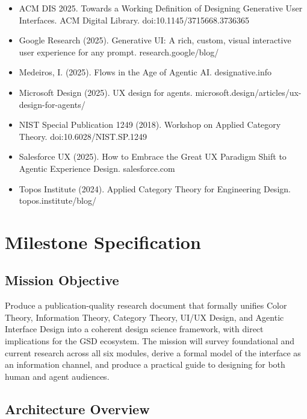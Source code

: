 \documentclass[11pt,letterpaper]{article}
\newcommand{\stageheader}[2]{%
  \noindent\colorbox{#2}{\makebox[\textwidth][l]{%
    \textcolor{white}{\bfseries\sffamily\hspace{6pt}#1\hspace{6pt}}}}%
  \vspace{0.5em}\par%
}
\begin{document}
\begin{itemize}[leftmargin=2em, itemsep=0.2em, label={--}]
  \item ACM DIS 2025. Towards a Working Definition of Designing Generative User Interfaces. ACM Digital Library. doi:10.1145/3715668.3736365
  \item Google Research (2025). Generative UI: A rich, custom, visual interactive user experience for any prompt. research.google/blog/
  \item Medeiros, I. (2025). Flows in the Age of Agentic AI. designative.info
  \item Microsoft Design (2025). UX design for agents. microsoft.design/articles/ux-design-for-agents/
  \item NIST Special Publication 1249 (2018). Workshop on Applied Category Theory. doi:10.6028/NIST.SP.1249
  \item Salesforce UX (2025). How to Embrace the Great UX Paradigm Shift to Agentic Experience Design. salesforce.com
  \item Topos Institute (2024). Applied Category Theory for Engineering Design. topos.institute/blog/
\end{itemize}

\newpage
\stageheader{STAGE 3 --- MISSION PACKAGE}{tertiary}

\section{Milestone Specification}

\subsection{Mission Objective}

Produce a publication-quality research document that formally unifies Color Theory, Information Theory, Category Theory, UI/UX Design, and Agentic Interface Design into a coherent design science framework, with direct implications for the GSD ecosystem. The mission will survey foundational and current research across all six modules, derive a formal model of the interface as an information channel, and produce a practical guide to designing for both human and agent audiences.

\subsection{Architecture Overview}
\end{document}
